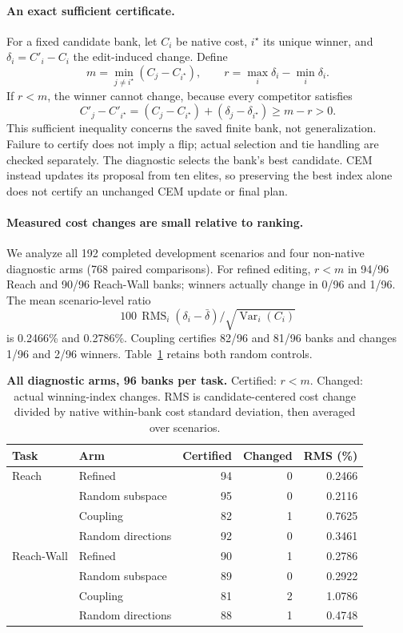 \documentclass{article}
\newcommand{\RMS}{\operatorname{RMS}}
\newcommand{\Var}{\operatorname{Var}}
\begin{document}
\paragraph{An exact sufficient certificate.}
For a fixed candidate bank, let \(C_i\) be native cost, \(i^\star\) its unique winner, and \(\delta_i=C'_i-C_i\) the edit-induced change. Define
\begin{equation}
 m=\min_{j\ne i^\star}(C_j-C_{i^\star}),\qquad
 r=\max_i\delta_i-\min_i\delta_i.
 \label{eq:margin}
\end{equation}
If \(r<m\), the winner cannot change, because every competitor satisfies
\begin{equation}
 C'_j-C'_{i^\star}
 =(C_j-C_{i^\star})+(\delta_j-\delta_{i^\star})
 \ge m-r>0.
 \label{eq:certificate}
\end{equation}
This sufficient inequality concerns the saved finite bank, not generalization. Failure to certify does not imply a flip; actual selection and tie handling are checked separately.
The diagnostic selects the bank's best candidate. CEM instead updates its proposal from ten elites, so preserving the best index alone does not certify an unchanged CEM update or final plan.

\paragraph{Measured cost changes are small relative to ranking.}
We analyze all 192 completed development scenarios and four non-native diagnostic arms (768 paired comparisons). For refined editing, \(r<m\) in 94/96 Reach and 90/96 Reach-Wall banks; winners actually change in 0/96 and 1/96. The mean scenario-level ratio
\[
 100\,\RMS_i(\delta_i-\bar\delta)/\sqrt{\Var_i(C_i)}
\]
is 0.2466\% and 0.2786\%. Coupling certifies 82/96 and 81/96 banks and changes 1/96 and 2/96 winners. Table~\ref{tab:margin} retains both random controls.



\begin{table}[t]
\centering\small
\caption{\textbf{All diagnostic arms, 96 banks per task.} Certified: \(r<m\). Changed: actual winning-index changes. RMS is candidate-centered cost change divided by native within-bank cost standard deviation, then averaged over scenarios.}
\label{tab:margin}
\setlength{\tabcolsep}{4pt}
\begin{tabular}{@{}llrrr@{}}
\toprule
Task & Arm & Certified & Changed & RMS (\%)\\
\midrule
Reach & Refined & 94 & 0 & 0.2466\\
 & Random subspace & 95 & 0 & 0.2116\\
 & Coupling & 82 & 1 & 0.7625\\
 & Random directions & 92 & 0 & 0.3461\\
Reach-Wall & Refined & 90 & 1 & 0.2786\\
 & Random subspace & 89 & 0 & 0.2922\\
 & Coupling & 81 & 2 & 1.0786\\
 & Random directions & 88 & 1 & 0.4748\\
\bottomrule
\end{tabular}
\end{table}
\end{document}
